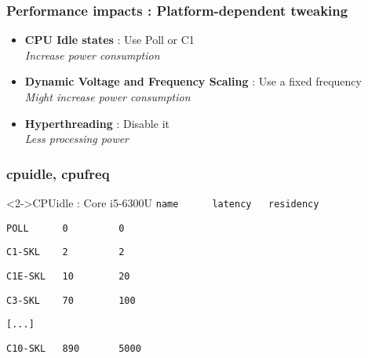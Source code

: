 \begin{frame}
	\frametitle{Performance impacts : Platform-dependent tweaking}
\begin{itemize}
	\item \textbf{CPU Idle states} : Use Poll or C1 \\ \small{\textit{Increase power consumption}}
	\vspace{0.3cm}
	\item \textbf{Dynamic Voltage and Frequency Scaling} : Use a fixed frequency \\ \small{\textit{Might increase power consumption}}
	\vspace{0.3cm}
	\item \textbf{Hyperthreading} : Disable it \\ \small{\textit{Less processing power}}
\end{itemize}
\end{frame}

\begin{frame}[fragile]
	\frametitle{cpuidle, cpufreq}

	\begin{block}<2->{CPUidle : Core i5-6300U}
	\verb+name      latency	  residency+

	\verb+POLL      0         0+

	\verb+C1-SKL    2         2+

	\verb+C1E-SKL   10        20+

	\verb+C3-SKL    70        100+

	\verb+[...]+

	\verb+C10-SKL   890       5000+
\end{block}
\end{frame}



